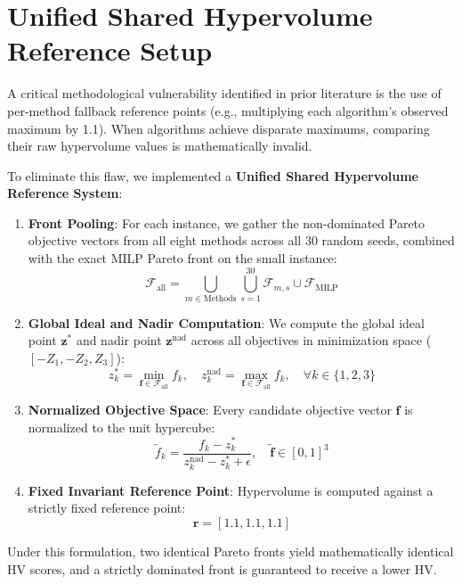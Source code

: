 \section{Unified Shared Hypervolume Reference Setup}
A critical methodological vulnerability identified in prior literature is the use of per-method fallback reference points (e.g., multiplying each algorithm's observed maximum by 1.1). When algorithms achieve disparate maximums, comparing their raw hypervolume values is mathematically invalid.

To eliminate this flaw, we implemented a \textbf{Unified Shared Hypervolume Reference System}:
\begin{enumerate}
    \item \textbf{Front Pooling}: For each instance, we gather the non-dominated Pareto objective vectors from all eight methods across all 30 random seeds, combined with the exact MILP Pareto front on the small instance:
    \begin{equation}
        \mathcal{F}_{\text{all}} = \bigcup_{m \in \text{Methods}} \bigcup_{s=1}^{30} \mathcal{F}_{m,s} \cup \mathcal{F}_{\text{MILP}}
    \end{equation}
    \item \textbf{Global Ideal and Nadir Computation}: We compute the global ideal point $\mathbf{z}^*$ and nadir point $\mathbf{z}^{\text{nad}}$ across all objectives in minimization space ($[-Z_1, -Z_2, Z_3]$):
    \begin{equation}
        z_k^* = \min_{\mathbf{f} \in \mathcal{F}_{\text{all}}} f_k, \quad z_k^{\text{nad}} = \max_{\mathbf{f} \in \mathcal{F}_{\text{all}}} f_k, \quad \forall k \in \{1, 2, 3\}
    \end{equation}
    \item \textbf{Normalized Objective Space}: Every candidate objective vector $\mathbf{f}$ is normalized to the unit hypercube:
    \begin{equation}
        \widetilde{f}_k = \frac{f_k - z_k^*}{z_k^{\text{nad}} - z_k^* + \epsilon}, \quad \widetilde{\mathbf{f}} \in [0, 1]^3
    \end{equation}
    \item \textbf{Fixed Invariant Reference Point}: Hypervolume is computed against a strictly fixed reference point:
    \begin{equation}
        \mathbf{r} = [1.1, 1.1, 1.1]
    \end{equation}
\end{enumerate}
Under this formulation, two identical Pareto fronts yield mathematically identical HV scores, and a strictly dominated front is guaranteed to receive a lower HV.

